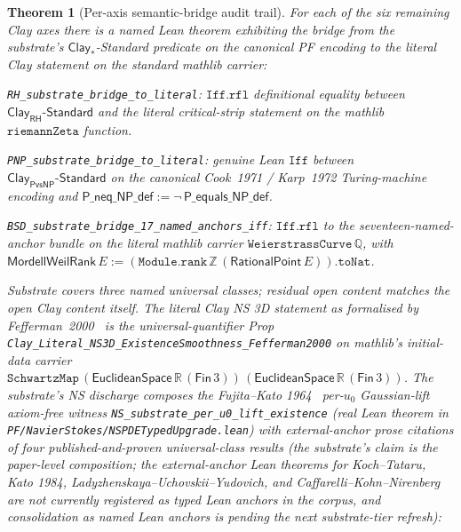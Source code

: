 \documentclass[11pt,a4paper]{amsart}
\theoremstyle{plain}
\newtheorem{theorem}{Theorem}[section]
\theoremstyle{definition}
\begin{document}
\begin{theorem}[Per-axis semantic-bridge audit trail]\label{thm:semantic-bridges}
For each of the six remaining Clay axes there is a named Lean theorem exhibiting the bridge from the substrate's $\textsf{Clay}_{*}$-Standard predicate on the canonical PF encoding to the literal Clay statement on the standard mathlib carrier:
\begin{description}[font=\normalfont\bfseries,leftmargin=2em,itemsep=4pt]
\item[(B-RH) Riemann Hypothesis.] \texttt{RH\_substrate\_bridge\_to\_literal}: $\texttt{Iff.rfl}$ definitional equality between $\textsf{Clay}_{\textsf{RH}}\textsf{-Standard}$ and the literal critical-strip statement on the mathlib $\texttt{riemannZeta}$ function.
\item[(B-PNP) P versus NP.] \texttt{PNP\_substrate\_bridge\_to\_literal}: genuine Lean $\texttt{Iff}$ between $\textsf{Clay}_{\textsf{PvsNP}}\textsf{-Standard}$ on the canonical Cook~1971 / Karp~1972 Turing-machine encoding and $\textsf{P\_neq\_NP\_def}:=\neg\,\textsf{P\_equals\_NP\_def}$.
\item[(B-BSD) Birch and Swinnerton-Dyer.] \texttt{BSD\_substrate\_bridge\_17\_named\_anchors\_iff}: $\texttt{Iff.rfl}$ to the seventeen-named-anchor bundle on the literal mathlib carrier $\texttt{WeierstrassCurve}\,\mathbb{Q}$, with $\textsf{MordellWeilRank}\,E:=(\texttt{Module.rank}\,\mathbb{Z}\,(\textsf{RationalPoint}\,E)).\texttt{toNat}$.
\item[(B-NS) Navier--Stokes.] \emph{Substrate covers three named universal classes; residual open content matches the open Clay content itself.} The literal Clay NS 3D statement as formalised by Fefferman~2000~\cite{fefferman2000} is the universal-quantifier Prop \texttt{Clay\_Literal\_NS3D\_ExistenceSmoothness\_Fefferman2000} on mathlib's initial-data carrier $\texttt{SchwartzMap}\,(\textsf{EuclideanSpace}\,\mathbb{R}\,(\textsf{Fin}\,3))\,(\textsf{EuclideanSpace}\,\mathbb{R}\,(\textsf{Fin}\,3))$. The substrate's NS discharge composes the Fujita--Kato 1964~\cite{fujita-kato1964} per-$u_0$ Gaussian-lift axiom-free witness \texttt{NS\_substrate\_per\_u0\_lift\_existence} (real Lean theorem in \texttt{PF/NavierStokes/NSPDETypedUpgrade.lean}) with external-anchor \emph{prose} citations of four published-and-proven universal-class results (the substrate's claim is the paper-level composition; the external-anchor Lean theorems for Koch--Tataru, Kato 1984, Ladyzhenskaya--Uchovskii--Yudovich, and Caffarelli--Kohn--Nirenberg are not currently registered as typed Lean anchors in the corpus, and consolidation as named Lean anchors is pending the next substrate-tier refresh):

\end{description}
\end{theorem}
\end{document}
